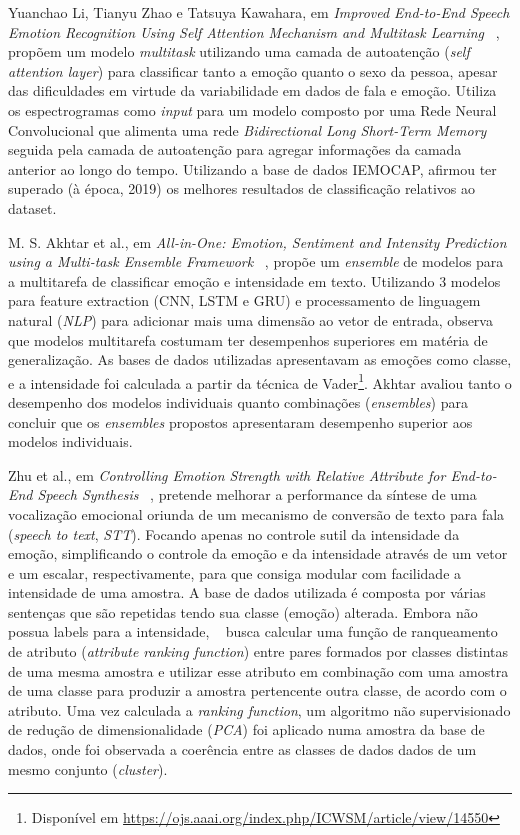 Yuanchao Li, Tianyu Zhao e Tatsuya Kawahara, em \textit{Improved End-to-End Speech Emotion Recognition Using Self Attention Mechanism and Multitask Learning} ~\cite{32.95}, propõem um modelo \textit{multitask} utilizando uma camada de autoatenção (\textit{self attention layer}) para classificar tanto a emoção quanto o sexo da pessoa, apesar das dificuldades em virtude da variabilidade em dados de fala e emoção. Utiliza os espectrogramas como \textit{input} para um modelo composto por uma Rede Neural Convolucional que alimenta uma rede \textit{Bidirectional Long Short-Term Memory} seguida pela camada de autoatenção para agregar informações da camada anterior ao longo do tempo. Utilizando a base de dados IEMOCAP, afirmou ter superado (à época, 2019) os melhores resultados de classificação relativos ao dataset.

M. S. Akhtar et al., em \textit{All-in-One: Emotion, Sentiment and Intensity Prediction using a Multi-task Ensemble Framework} ~\cite{28}, propõe um \textit{ensemble} de modelos para a multitarefa de classificar emoção e intensidade em texto. Utilizando 3 modelos para feature extraction (\acrshort{CNN}, \acrlong{LSTM} e \acrshort{GRU}) e processamento de linguagem natural (\textit{NLP}) para adicionar mais uma dimensão ao vetor de entrada, observa que modelos multitarefa
 costumam ter desempenhos superiores em matéria de generalização. As bases de dados utilizadas apresentavam as emoções como classe, e a intensidade foi calculada a partir da técnica de Vader\footnote{Disponível em \url{https://ojs.aaai.org/index.php/ICWSM/article/view/14550}}. Akhtar avaliou tanto o desempenho dos modelos individuais quanto combinações (\textit{ensembles}) para concluir que os \textit{ensembles} propostos apresentaram desempenho superior aos modelos individuais.

Zhu et al., em \textit{Controlling Emotion Strength with Relative Attribute for End-to-End Speech Synthesis} ~\cite{63}, pretende melhorar a performance da síntese de uma vocalização emocional oriunda de um mecanismo de conversão de texto para fala (\textit{speech to text}, \textit{STT}). Focando apenas no controle sutil da intensidade da emoção, simplificando o controle da emoção e da intensidade através de um vetor e um escalar, respectivamente, para que consiga modular com facilidade a intensidade de uma amostra. A base de dados utilizada é composta por várias sentenças que são repetidas tendo sua classe (emoção) alterada. Embora não possua labels para a intensidade, ~\cite{63} busca calcular uma função de ranqueamento de atributo (\textit{attribute ranking function}) entre pares formados por classes distintas de uma mesma amostra e utilizar esse atributo em combinação com uma amostra de uma classe para produzir a amostra pertencente outra classe, de acordo com o atributo. Uma vez calculada a \textit{ranking function}, um algoritmo não supervisionado de redução de dimensionalidade (\textit{PCA}) foi aplicado numa amostra da base de dados, onde foi observada a coerência entre as classes de dados dados de um mesmo conjunto (\textit{cluster}).

